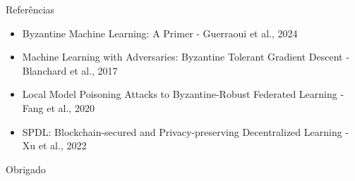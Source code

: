 \documentclass[aspectratio=169]{beamer}
\begin{document}
\begin{frame}{Referências}
    \begin{itemize}
        \item Byzantine Machine Learning: A Primer - Guerraoui et al., 2024
        \item Machine Learning with Adversaries: Byzantine Tolerant Gradient Descent - Blanchard et al., 2017
        \item Local Model Poisoning Attacks to Byzantine-Robust Federated Learning - Fang et al., 2020
        \item SPDL: Blockchain-secured and Privacy-preserving Decentralized Learning - Xu et al., 2022
    \end{itemize}
\end{frame}

\begin{frame}
  \centering
  \Huge Obrigado
\end{frame}
\end{document}
